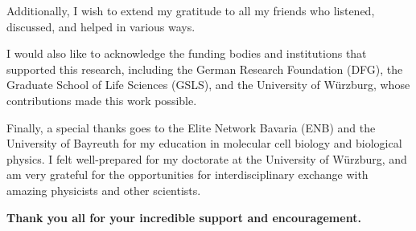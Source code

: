 \begin{center}
    \noindent Additionally, I wish to extend my gratitude to all my friends who
 listened, discussed, and helped in various ways.

    \noindent I would also like to acknowledge the funding bodies and
    institutions that supported this research, including the German Research
    Foundation (DFG), the Graduate School of Life Sciences (GSLS), and the University of
    Würzburg, whose contributions made this work possible.

    \noindent Finally, a special thanks goes to the Elite Network Bavaria (ENB)
    and the University of Bayreuth for my education in molecular cell biology
    and biological physics. I felt well-prepared for my doctorate at the
    University of Würzburg, and am very grateful for the opportunities for
    interdisciplinary exchange with amazing physicists and other scientists.

    \noindent \textbf{Thank you all for your incredible support and encouragement.}

\end{center}